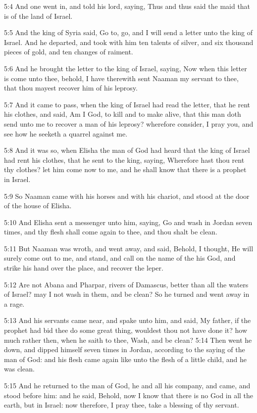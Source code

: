 5:4 And one went in, and told his lord, saying, Thus and thus said the
maid that is of the land of Israel.

5:5 And the king of Syria said, Go to, go, and I will send a letter
unto the king of Israel. And he departed, and took with him ten
talents of silver, and six thousand pieces of gold, and ten changes of
raiment.

5:6 And he brought the letter to the king of Israel, saying, Now when
this letter is come unto thee, behold, I have therewith sent Naaman my
servant to thee, that thou mayest recover him of his leprosy.

5:7 And it came to pass, when the king of Israel had read the letter,
that he rent his clothes, and said, Am I God, to kill and to make
alive, that this man doth send unto me to recover a man of his
leprosy? wherefore consider, I pray you, and see how he seeketh a
quarrel against me.

5:8 And it was so, when Elisha the man of God had heard that the king
of Israel had rent his clothes, that he sent to the king, saying,
Wherefore hast thou rent thy clothes? let him come now to me, and he
shall know that there is a prophet in Israel.

5:9 So Naaman came with his horses and with his chariot, and stood at
the door of the house of Elisha.

5:10 And Elisha sent a messenger unto him, saying, Go and wash in
Jordan seven times, and thy flesh shall come again to thee, and thou
shalt be clean.

5:11 But Naaman was wroth, and went away, and said, Behold, I thought,
He will surely come out to me, and stand, and call on the name of the
\LORD his God, and strike his hand over the place, and recover the
leper.

5:12 Are not Abana and Pharpar, rivers of Damascus, better than all
the waters of Israel? may I not wash in them, and be clean? So he
turned and went away in a rage.

5:13 And his servants came near, and spake unto him, and said, My
father, if the prophet had bid thee do some great thing, wouldest thou
not have done it? how much rather then, when he saith to thee, Wash,
and be clean?  5:14 Then went he down, and dipped himself seven times
in Jordan, according to the saying of the man of God: and his flesh
came again like unto the flesh of a little child, and he was clean.

5:15 And he returned to the man of God, he and all his company, and
came, and stood before him: and he said, Behold, now I know that there
is no God in all the earth, but in Israel: now therefore, I pray thee,
take a blessing of thy servant.

